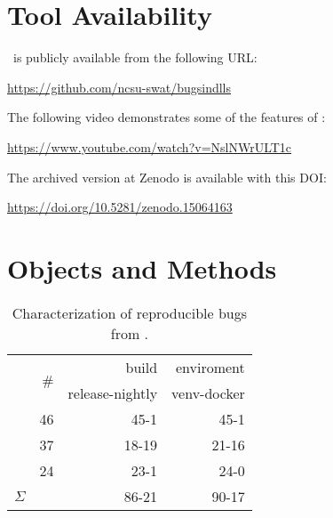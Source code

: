 \documentclass[sigconf,screen]{acmart}
\begin{document}

\section{Tool Availability}
\label{sec:tool-availability}
\tname\ is publicly available from the following URL:

\url{https://github.com/ncsu-swat/bugsindlls}

The following video demonstrates some
of the features of \tname:

\url{https://www.youtube.com/watch?v=NslNWrULT1c}

The archived version at Zenodo is available with this DOI:

\url{https://doi.org/10.5281/zenodo.15064163}\\


\section{Objects and Methods}

\begin{table}
  \centering
  \caption{\label{table:bug-characterization}Characterization of
    reproducible bugs from \tname.}
\begin{tabular}{l|rrr}
  \toprule & \multirow{2}{*}{\#} & \multicolumn{1}{r}{build} &
  \multicolumn{1}{r}{enviroment} \\ & & release-nightly & venv-docker
  \\ \cmidrule(lr){2-4} \jax{} & 46 & 45-1 & 45-1 \\ \torch{} & 37 &
  18-19 & 21-16 \\ \tf{} & 24 & 23-1 & 24-0 \\ \midrule
  \multicolumn{1}{c|}{$\Sigma$} & \numbugs{} & 86-21& 90-17
  \\ \bottomrule
\end{tabular}
\end{table}
\end{document}
